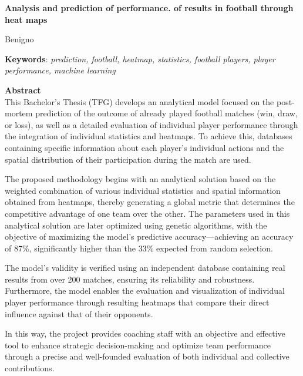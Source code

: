 \cleardoublepage

\begin{center}
	{\large\bfseries Analysis and prediction of performance.
of results in football through
heat maps}\\
\end{center}
\begin{center}
	Benigno\\
\end{center}
\vspace{0.5cm}
\noindent\textbf{Keywords}: \textit{prediction, football, heatmap, statistics, football players, player performance, \textit{machine learning}}
\vspace{0.7cm}

\noindent\textbf{Abstract}\\
This Bachelor's Thesis (TFG) develops an analytical model focused on the post-mortem prediction of the outcome of already played football matches (win, draw, or loss), as well as a detailed evaluation of individual player performance through the integration of individual statistics and heatmaps. To achieve this, databases containing specific information about each player's individual actions and the spatial distribution of their participation during the match are used.

The proposed methodology begins with an analytical solution based on the weighted combination of various individual statistics and spatial information obtained from heatmaps, thereby generating a global metric that determines the competitive advantage of one team over the other. The parameters used in this analytical solution are later optimized using genetic algorithms, with the objective of maximizing the model's predictive accuracy—achieving an accuracy of 87\%, significantly higher than the 33\% expected from random selection.

The model’s validity is verified using an independent database containing real results from over 200 matches, ensuring its reliability and robustness. Furthermore, the model enables the evaluation and visualization of individual player performance through resulting heatmaps that compare their direct influence against that of their opponents.

In this way, the project provides coaching staff with an objective and effective tool to enhance strategic decision-making and optimize team performance through a precise and well-founded evaluation of both individual and collective contributions.

\cleardoublepage

